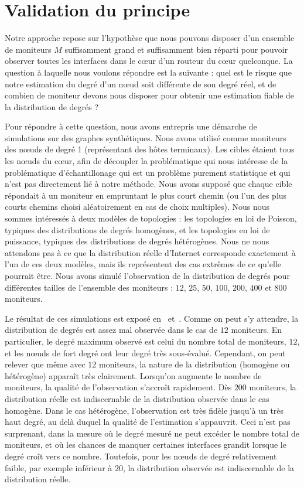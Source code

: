 \section{Validation du principe}
\label{sec:udpping-simuls}

Notre approche repose sur l'hypothèse que nous pouvons disposer d'un ensemble de
moniteurs $M$ suffisamment grand et suffisamment bien réparti pour pouvoir
observer toutes les interfaces dans le c\oe{}ur d'un routeur du c\oe{}ur
quelconque.
La question à laquelle nous voulons répondre est la suivante : quel est le
risque que notre estimation du degré d'un n\oe{}ud soit différente de son degré
réel, et de combien de moniteur devons nous disposer pour obtenir une estimation
fiable de la distribution de degrés ?

Pour répondre à cette question, nous avons entrepris une démarche de simulations
sur des graphes synthétiques. Nous avons utilisé comme moniteurs des n\oe{}uds de
degré 1 (représentant des hôtes terminaux). Les cibles étaient tous les n\oe{}uds
du c\oe{}ur, afin de découpler la problématique qui nous intéresse de la
problématique d'échantillonage qui est un problème purement statistique et qui
n'est pas directement lié à notre méthode. Nous avons supposé que chaque cible
répondait à un moniteur en empruntant le plus court chemin (ou l'un des plus
courts chemins choisi aléatoirement en cas de choix multiples). Nous nous sommes
intéressés à deux modèles de topologies : les topologies en loi de Poisson,
typiques des distributions de degrés homogènes, et les topologies en loi de
puissance, typiques des distributions de degrés hétérogènes. Nous ne nous
attendons pas à ce que la distribution réelle d'Internet corresponde
exactement à l'un de ces deux modèles, mais ils représentent des cas extrêmes de ce qu'elle pourrait
être. Nous avons simulé l'observation de la distribution de degrés pour
différentes tailles de l'ensemble des moniteurs : $12$, $25$, $50$, $100$,
$200$, $400$ et $800$ moniteurs.

Le résultat de ces simulations est exposé
en~
et~.
Comme on peut s'y attendre, la distribution de degrés est assez mal observée
dans le cas de $12$ moniteurs. En particulier, le degré maximum observé est celui du
nombre total de moniteurs, $12$, et les n\oe{}uds de fort degré ont leur degré très
sous-évalué. Cependant, on peut relever que même avec $12$ moniteurs, la nature
de la distribution (homogène ou hétérogène) apparaît très clairement. Lorsqu'on
augmente le nombre de moniteurs, la qualité de l'observation s'accroît
rapidement. Dès $200$ moniteurs, la distribution réelle est indiscernable de la
distribution observée dans le cas homogène. Dans le cas hétérogène,
l'observation est très fidèle jusqu'à un très haut degré, au delà duquel la qualité de
l'estimation s'appauvrit. Ceci n'est pas surprenant, dans la mesure où le degré
mesuré ne peut excéder le nombre total de moniteurs, et où les chances de
manquer certaines interfaces grandit lorsque le degré croît vers ce nombre.
Toutefois, pour les n\oe{}uds de degré relativement faible, par exemple inférieur à
$20$, la distribution observée est indiscernable de la distribution réelle.



